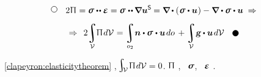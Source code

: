 \vspace{-0.55em}\begin{multline*}
\tikz[baseline=-1ex] \draw [line width=.5pt, color=black, fill=white] (0, 0) circle (.8ex);
\hspace{2.25ex}
2 \hspace{.1ex} \potentialenergydensity \hspace{.1ex} = \linearstress \dotdotp \infinitesimaldeformation =
\linearstress \hspace{.1ex} \dotdotp \hspace{-0.12ex} \boldnabla \bm{u}^{\mathsf{S}} \hspace{-0.12ex} =
\boldnabla \hspace{-0.1ex} \dotp \left( \hspace{.1ex} \linearstress \dotp \bm{u} \hspace{.1ex} \right) -
\tikzmark{beginMinusLoad} \boldnabla \dotp \linearstress \tikzmark{endMinusLoad} \dotp \bm{u} \;\Rightarrow
\\[.5em]
%
\Rightarrow\;\,
\displaystyle 2 \hspace{-0.16em}
\integral\displaylimits_{\mathcal{V}} \hspace{-0.5ex}
  \potentialenergydensity \hspace{.2ex} d\mathcal{V} \hspace{.12ex}
= \integral\displaylimits_{o_2} \hspace{-0.4ex}
\tikzmark{beginSurfaceLoad}
  \unitnormalvector \dotp \linearstress
\tikzmark{endSurfaceLoad} \hspace{.1ex}
  \dotp \bm{u} \hspace{.25ex} do \hspace{.4ex}
+ \integral\displaylimits_{\mathcal{V}} \hspace{-0.4ex}
  \volumeloadvector \hspace{-0.1ex} \dotp \bm{u} \hspace{.25ex}
  d\mathcal{V}
\hspace{2.25ex}
\tikz[baseline=-0.6ex] \draw [color=black, fill=black] (0, 0) circle (.8ex);
\end{multline*}%
%

\vspace{-0.2em}
~\eqref{clapeyron:elasticitytheorem}
,
${\hspace{-0.25ex}
\scalebox{1.4}{$ \integral $}_
{ \hspace{-0.5ex}
   \raisemath{.1em}{\mathcal{V}}
} \hspace{.25ex}
\potentialenergydensity \hspace{.2ex} d\mathcal{V}
= 0
}$.
 $\Uppi$
,
~$\linearstress$,
~$\infinitesimaldeformation$
.

